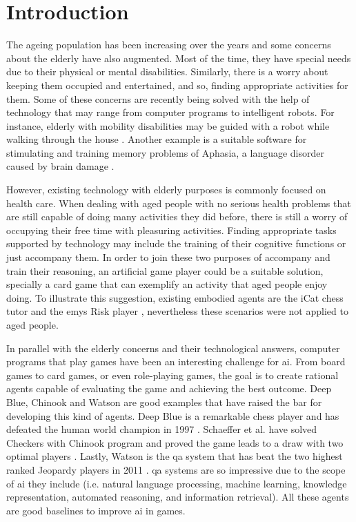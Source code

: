 \section{Introduction} \label{introduction}

The ageing population has been increasing over the years and some concerns about the elderly have also augmented.
Most of the time, they have special needs due to their physical or mental disabilities.
Similarly, there is a worry about keeping them occupied and entertained, and so, finding appropriate activities for them.
Some of these concerns are recently being solved with the help of technology that may range from computer programs to intelligent robots.
For instance, elderly with mobility disabilities may be guided with a robot while walking through the house \cite{Pollack2002}.
Another example is a suitable software for stimulating and training memory problems of Aphasia, a language disorder caused by brain damage \cite{Pompili2011}.

However, existing technology with elderly purposes is commonly focused on health care.
When dealing with aged people with no serious health problems that are still capable of doing many activities they did before, there is still a worry of occupying their free time with pleasuring activities.
Finding appropriate tasks supported by technology may include the training of their cognitive functions or just accompany them.
In order to join these two purposes of accompany and train their reasoning, an artificial game player could be a suitable solution, specially a card game that can exemplify an activity that aged people enjoy doing.
To illustrate this suggestion, existing embodied agents are the iCat chess tutor \cite{Affective2007} and the \gls{emys} Risk player \cite{Pereira}, nevertheless these scenarios were not applied to aged people.


In parallel with the elderly concerns and their technological answers, computer programs that play games have been an interesting challenge for \gls{ai}.
From board games to card games, or even role-playing games, the goal is to create rational agents capable of evaluating the game and achieving the best outcome.
Deep Blue, Chinook and Watson are good examples that have raised the bar for developing this kind of agents.
Deep Blue is a remarkable chess player and has defeated the human world champion in 1997 \cite{Campbell2002}.
Schaeffer et al. have solved Checkers with Chinook program and proved the game leads to a draw with two optimal players \cite{Schaeffer1996}.
Lastly, Watson is the \gls{qa} system that has beat the two highest ranked Jeopardy players in 2011 \cite{Ferrucci2010}.
\gls{qa} systems are so impressive due to the scope of \gls{ai} they include (i.e. natural language processing, machine learning, knowledge representation, automated reasoning, and information retrieval).
All these agents are good baselines to improve \gls{ai} in games.


